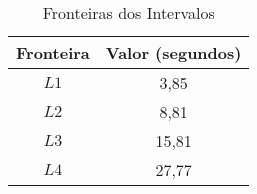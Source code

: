 \begin{table}[htpb]
\begin{center}
\begin{tabular}{cc}
\toprule
Fronteira & Valor (segundos) \\ \midrule
$L1$ & 3,85                    \\ 
$L2$ & 8,81                    \\ 
$L3$ & 15,81                   \\ 
$L4$ & 27,77                   \\ 
\bottomrule
\end{tabular}
\end{center}
\caption{Fronteiras dos Intervalos }
\label{tab:tabela3}
\end{table}

